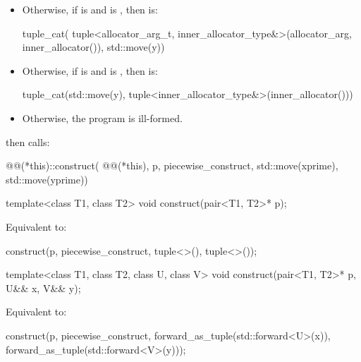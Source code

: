 \begin{itemdescr}
\begin{itemize}
\item Otherwise, if  is 
and
is
, then  is:
\begin{codeblock}
tuple_cat(
    tuple<allocator_arg_t, inner_allocator_type&>(allocator_arg, inner_allocator()),
    std::move(y))
\end{codeblock}

\item Otherwise, if  is
 and
 is ,
then  is:
\begin{codeblock}
tuple_cat(std::move(y), tuple<inner_allocator_type&>(inner_allocator()))
\end{codeblock}

\item Otherwise, the program is ill-formed.
\end{itemize}
then calls:
\begin{codeblock}
@@(*this)::construct(
    @@(*this), p, piecewise_construct, std::move(xprime), std::move(yprime))
\end{codeblock}
\end{itemdescr}

%
\begin{itemdecl}
template<class T1, class T2>
  void construct(pair<T1, T2>* p);
\end{itemdecl}

\begin{itemdescr}
\pnum
\effects Equivalent to:
\begin{codeblock}
construct(p, piecewise_construct, tuple<>(), tuple<>());
\end{codeblock}
\end{itemdescr}

%
\begin{itemdecl}
template<class T1, class T2, class U, class V>
  void construct(pair<T1, T2>* p, U&& x, V&& y);
\end{itemdecl}

\begin{itemdescr}
\pnum
\effects Equivalent to:
\begin{codeblock}
construct(p, piecewise_construct,
          forward_as_tuple(std::forward<U>(x)),
          forward_as_tuple(std::forward<V>(y)));
\end{codeblock}
\end{itemdescr}

